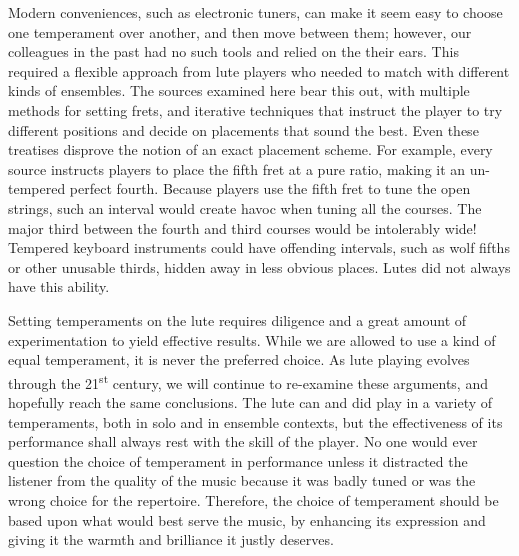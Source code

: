 Modern conveniences, such as electronic tuners, can make it seem easy to choose one temperament over another, and then
move between them; however, our colleagues in the past had no such tools and relied on the their ears. This required a
flexible approach from lute players who needed to match with different kinds of ensembles. The sources examined here
bear this out, with multiple methods for setting frets, and iterative techniques that instruct the player to try
different positions and decide on placements that sound the best. Even these treatises disprove the notion of an exact
placement scheme. For example, every source instructs players to place the fifth fret at a pure ratio, making it an un-
tempered perfect fourth. Because players use the fifth fret to tune the open strings, such an interval would create
havoc when tuning all the courses. The major third between the fourth and third courses would be intolerably wide!
Tempered keyboard instruments could have offending intervals, such as wolf fifths or other unusable thirds, hidden away
in less obvious places. Lutes did not always have this ability.

Setting temperaments on the lute requires diligence and a great amount of experimentation to yield effective results.
While we are allowed to use a kind of equal temperament, it is never the preferred choice. As lute playing evolves
through the 21\textsuperscript{st} century, we will continue to re-examine these arguments, and hopefully reach the same
conclusions. The lute can and did play in a variety of temperaments, both in solo and in ensemble contexts, but the
effectiveness of its performance shall always rest with the skill of the player. No one would ever question the choice
of temperament in performance unless it distracted the listener from the quality of the music because it was badly tuned
or was the wrong choice for the repertoire. Therefore, the choice of temperament should be based upon what would best
serve the music, by enhancing its expression and giving it the warmth and brilliance it justly deserves.
